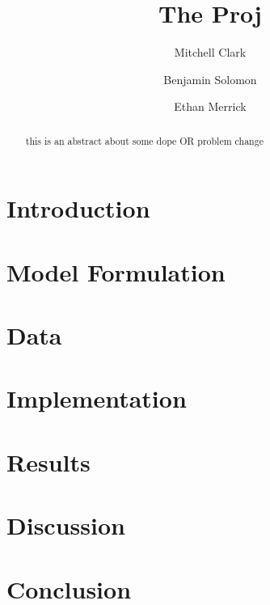 \documentclass[reqno]{amsart}
\theoremstyle{plain}
\theoremstyle{definition}
\numberwithin{equation}{section}
\begin{document}
	\title[]{The Proj}
	
	\author[M.~Clark]{Mitchell Clark}
	\author[B.~Solomon]{Benjamin Solomon}
    \author[E.~Merrick]{Ethan Merrick}
	
	\subjclass[2010]{}
	
	
	\begin{abstract}
    this is an abstract about some dope OR problem
	change
	\end{abstract}
	
	\maketitle
	
	\setcounter{tocdepth}{1}
	\tableofcontents

	\section{Introduction}
	

	\section{Model Formulation}
	

	\section{Data}
	

	\section{Implementation}
	

	\section{Results}
	

	\section{Discussion}
	
	
	\section{Conclusion}
	



	
	\appendix
	
	
	{}
\end{document}

